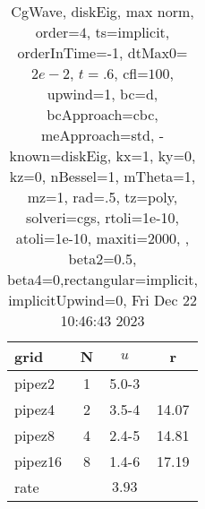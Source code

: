 \begin{table}[H]\tableFont %
\begin{center}
\begin{tabular}{|l|c|c|c|} \hline 
grid  & N &  $ u $ & r \\ \hline 
    pipez2 &     1 & \num{5.0}{-3} &        \\ \hline
    pipez4 &     2 & \num{3.5}{-4} & 14.07  \\ \hline
    pipez8 &     4 & \num{2.4}{-5} & 14.81  \\ \hline
   pipez16 &     8 & \num{1.4}{-6} & 17.19  \\ \hline
    rate             &       &  $3.93$       &       \\ \hline
\end{tabular}
\caption{CgWave, diskEig, max norm, order=$4$, ts=implicit, orderInTime=-1, dtMax0=$2e-2$, $t=.6$, cfl=$100$, upwind=1, bc=d, bcApproach=cbc, meApproach=std, -known=diskEig, kx=1, ky=0, kz=0, nBessel=1, mTheta=1, mz=1, rad=.5, tz=poly, solveri=cgs, rtoli=1e-10, atoli=1e-10, maxiti=2000, , beta2=0.5, beta4=0,rectangular=implicit, implicitUpwind=0, Fri Dec 22 10:46:43 2023}\label{table:diskEigOrder4max}
\end{center}
\end{table}

